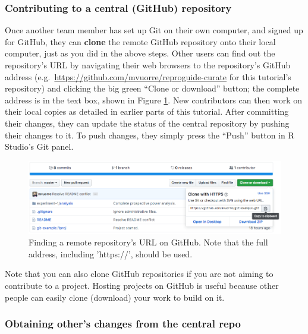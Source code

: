 \documentclass[
  american,
  ,doc,floatsintext]{apa6}
\begin{document}
\hypertarget{contributing-to-a-central-github-repository}{%
\subsubsection{Contributing to a central (GitHub) repository}\label{contributing-to-a-central-github-repository}}

Once another team member has set up Git on their own computer, and signed up for GitHub, they can \textbf{clone} the remote GitHub repository onto their local computer, just as you did in the above steps. Other users can find out the repository's URL by navigating their web browsers to the repository's GitHub address (e.g.~\url{https://github.com/mvuorre/reproguide-curate} for this tutorial's repository) and clicking the big green ``Clone or download'' button; the complete address is in the text box, shown in Figure \ref{fig:url-from-github}. New contributors can then work on their local copies as detailed in earlier parts of this tutorial. After committing their changes, they can update the status of the central repository by pushing their changes to it. To push changes, they simply press the ``Push'' button in R Studio's Git panel.

\begin{figure}

{\centering \includegraphics[width=6in]{images/github-url} 

}

\caption{Finding a remote repository's URL on GitHub. Note that the full address, including 'https://', should be used.}\label{fig:url-from-github}
\end{figure}

Note that you can also clone GitHub repositories if you are not aiming to contribute to a project. Hosting projects on GitHub is useful because other people can easily clone (download) your work to build on it.

\hypertarget{obtaining-others-changes-from-the-central-repo}{%
\subsubsection{Obtaining other's changes from the central repo}\label{obtaining-others-changes-from-the-central-repo}}
\end{document}
